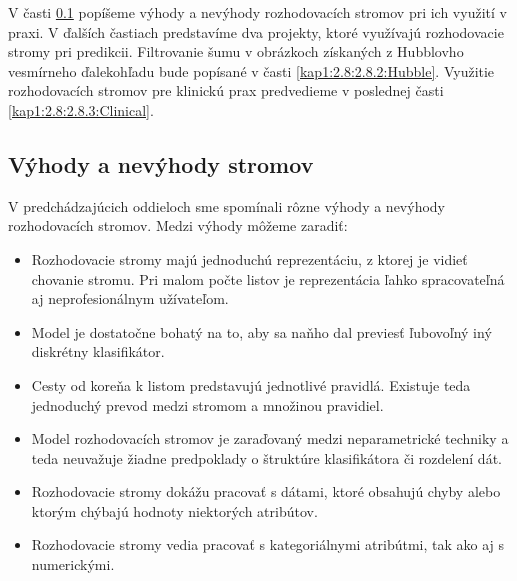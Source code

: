 V časti \ref{kap1:2.8:2.8.1:AdvAndDis} popíšeme výhody a nevýhody rozhodovacích stromov pri ich využití v praxi. V ďalších častiach predstavíme dva projekty, ktoré využívajú rozhodovacie stromy pri predikcii. Filtrovanie šumu v obrázkoch získaných z Hubblovho vesmírneho ďalekohľadu bude popísané v časti \ref{kap1:2.8:2.8.2:Hubble}. Využitie rozhodovacích stromov pre klinickú prax predvedieme v poslednej časti \ref{kap1:2.8:2.8.3:Clinical}.

\subsection{Výhody a nevýhody stromov}\label{kap1:2.8:2.8.1:AdvAndDis}
V predchádzajúcich oddieloch sme spomínali rôzne výhody a nevýhody rozhodovacích stromov. Medzi výhody môžeme zaradiť:
\begin{itemize}
\item Rozhodovacie stromy majú jednoduchú reprezentáciu, z ktorej je vidieť chovanie stromu. Pri malom počte listov je reprezentácia ľahko spracovateľná aj neprofesionálnym užívateľom.
\item Model je dostatočne bohatý na to, aby sa naňho dal previesť ľubovoľný iný diskrétny klasifikátor.
\item Cesty od koreňa k listom predstavujú jednotlivé pravidlá. Existuje teda jednoduchý prevod medzi stromom a množinou pravidiel.
\item Model rozhodovacích stromov je zaraďovaný medzi neparametrické techniky a teda neuvažuje žiadne predpoklady o štruktúre klasifikátora či rozdelení dát.
\item Rozhodovacie stromy dokážu pracovať s dátami, ktoré obsahujú chyby alebo ktorým chýbajú hodnoty niektorých atribútov.
\item Rozhodovacie stromy vedia pracovať s kategoriálnymi atribútmi, tak ako aj s numerickými.
\end{itemize}

